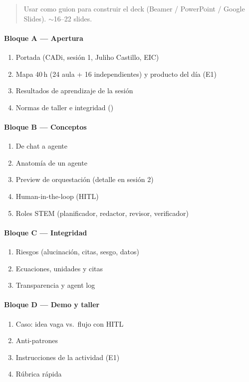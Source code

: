 \begin{quote}
Usar como guion para construir el deck (Beamer / PowerPoint / Google Slides). $\sim$16--22 slides.
\end{quote}

\paragraph{Bloque A --- Apertura}\begin{enumerate}
\item Portada (CADi, sesión 1, Juliho Castillo, EIC)
\item Mapa 40\,h (24 aula + 16 independientes) y producto del día (E1)
\item Resultados de aprendizaje de la sesión
\item Normas de taller e integridad (\ceddie)
\end{enumerate}
\paragraph{Bloque B --- Conceptos}\begin{enumerate}
\item De chat a agente
\item Anatomía de un agente
\item Preview de orquestación (detalle en sesión 2)
\item Human-in-the-loop (HITL)
\item Roles STEM (planificador, redactor, revisor, verificador)
\end{enumerate}
\paragraph{Bloque C --- Integridad}\begin{enumerate}
\item Riesgos (alucinación, citas, sesgo, datos)
\item Ecuaciones, unidades y citas
\item Transparencia y agent log
\end{enumerate}
\paragraph{Bloque D --- Demo y taller}\begin{enumerate}
\item Caso: idea vaga vs.\ flujo con HITL
\item Anti-patrones
\item Instrucciones de la actividad (E1)
\item Rúbrica rápida
\end{enumerate}
